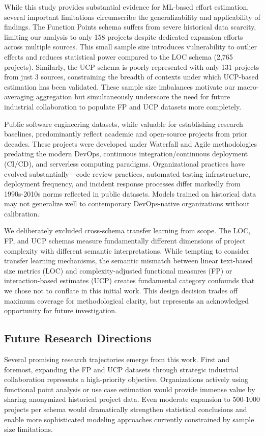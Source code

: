\documentclass[11pt,a4paper]{article}
\begin{document}
While this study provides substantial evidence for ML-based effort estimation, several important limitations circumscribe the generalizability and applicability of findings. The Function Points schema suffers from severe historical data scarcity, limiting our analysis to only 158 projects despite dedicated expansion efforts across multiple sources. This small sample size introduces vulnerability to outlier effects and reduces statistical power compared to the LOC schema (2,765 projects). Similarly, the UCP schema is poorly represented with only 131 projects from just 3 sources, constraining the breadth of contexts under which UCP-based estimation has been validated. These sample size imbalances motivate our macro-averaging aggregation but simultaneously underscore the need for future industrial collaboration to populate FP and UCP datasets more completely.

Public software engineering datasets, while valuable for establishing research baselines, predominantly reflect academic and open-source projects from prior decades. These projects were developed under Waterfall and Agile methodologies predating the modern DevOps, continuous integration/continuous deployment (CI/CD), and serverless computing paradigms. Organizational practices have evolved substantially---code review practices, automated testing infrastructure, deployment frequency, and incident response processes differ markedly from 1990s-2010s norms reflected in public datasets. Models trained on historical data may not generalize well to contemporary DevOps-native organizations without calibration.

We deliberately excluded cross-schema transfer learning from scope. The LOC, FP, and UCP schemas measure fundamentally different dimensions of project complexity with different semantic interpretations. While tempting to consider transfer learning mechanisms, the semantic mismatch between linear text-based size metrics (LOC) and complexity-adjusted functional measures (FP) or interaction-based estimates (UCP) creates fundamental category confounds that we chose not to conflate in this initial work. This design decision trades off maximum coverage for methodological clarity, but represents an acknowledged opportunity for future investigation.

\subsection{Future Research Directions}

Several promising research trajectories emerge from this work. First and foremost, expanding the FP and UCP datasets through strategic industrial collaboration represents a high-priority objective. Organizations actively using functional point analysis or use case estimation would provide immense value by sharing anonymized historical project data. Even moderate expansion to 500-1000 projects per schema would dramatically strengthen statistical conclusions and enable more sophisticated modeling approaches currently constrained by sample size limitations.
\end{document}
